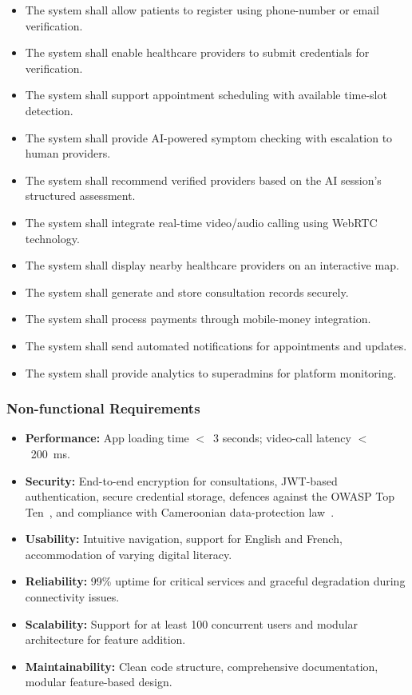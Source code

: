 \begin{itemize}
  \item The system shall allow patients to register using phone-number or email verification.
  \item The system shall enable healthcare providers to submit credentials for verification.
  \item The system shall support appointment scheduling with available time-slot detection.
  \item The system shall provide AI-powered symptom checking with escalation to human providers.
  \item The system shall recommend verified providers based on the AI session's structured assessment.
  \item The system shall integrate real-time video/audio calling using WebRTC technology.
  \item The system shall display nearby healthcare providers on an interactive map.
  \item The system shall generate and store consultation records securely.
  \item The system shall process payments through mobile-money integration.
  \item The system shall send automated notifications for appointments and updates.
  \item The system shall provide analytics to superadmins for platform monitoring.
\end{itemize}

\subsubsection*{Non-functional Requirements}

\begin{itemize}
  \item \textbf{Performance:} App loading time $<$~3 seconds; video-call latency $<$~200~ms.
  \item \textbf{Security:} End-to-end encryption for consultations, JWT-based authentication, secure credential storage, defences against the OWASP Top Ten~\cite{owasp_top10}, and compliance with Cameroonian data-protection law~\cite{cameroon_law_2010_012}.
  \item \textbf{Usability:} Intuitive navigation, support for English and French, accommodation of varying digital literacy.
  \item \textbf{Reliability:} 99\% uptime for critical services and graceful degradation during connectivity issues.
  \item \textbf{Scalability:} Support for at least 100 concurrent users and modular architecture for feature addition.
  \item \textbf{Maintainability:} Clean code structure, comprehensive documentation, modular feature-based design.
\end{itemize}

